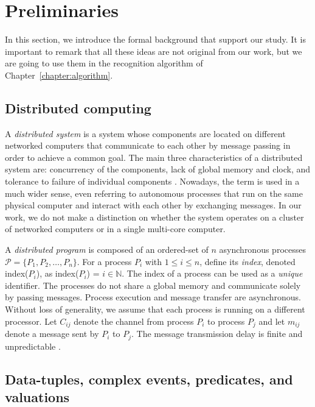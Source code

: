 \chapter{Preliminaries}\label{chapter:preliminaries}

In this section, we introduce the formal background that support our study. It is important to remark that all these ideas are not original from our work, but we are going to use them in the recognition algorithm of Chapter~\ref{chapter:algorithm}.

\section{Distributed computing}\label{sec:distributed_computing}

A \emph{distributed system} is a system whose components are located on different networked computers that communicate to each other by message passing in order to achieve a common goal. The main three characteristics of a distributed system are: concurrency of the components, lack of global memory and clock, and tolerance to failure of individual components \cite{distributed-computing-book}. Nowadays, the term is used in a much wider sense, even referring to autonomous processes that run on the same physical computer and interact with each other by exchanging messages. In our work, we do not make a distinction on whether the system operates on a cluster of networked computers or in a single multi-core computer.

A \emph{distributed program} is composed of an ordered-set of $n$ asynchronous processes $\mathcal{P} = \{ P_{1}, P_{2}, \ldots, P_{n}\}$. For a process $P_{i}$ with $1 \le i \le n$, define its \emph{index}, denoted index($P_{i}$), as index($P_{i}$) = $i \in \mathbb{N}$. The index of a process can be used as a \emph{unique} identifier. The processes do not share a global memory and communicate solely by passing messages. Process execution and message transfer are asynchronous. Without loss of generality, we assume that each process is running on a different processor. Let $C_{ij}$ denote the channel from process $P_{i}$ to process $P_{j}$ and let $m_{ij}$ denote a message sent by $P_{i}$ to $P_{j}$. The message transmission delay is finite and unpredictable \cite{distributed-computing-book}.

\section{Data-tuples, complex events, predicates, and valuations}\label{sec:ceql}

